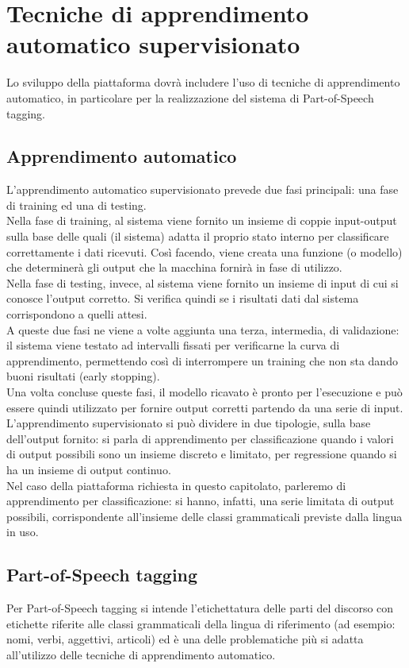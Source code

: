 \section{Tecniche di apprendimento automatico supervisionato}
Lo sviluppo della piattaforma dovrà includere l'uso di tecniche di apprendimento automatico, in particolare per la realizzazione del sistema di Part-of-Speech tagging. 
\subsection{Apprendimento automatico}
L'apprendimento automatico supervisionato prevede due fasi principali: una fase di training ed una di testing. \\
Nella fase di training, al sistema viene fornito un insieme di coppie input-output sulla base delle quali (il sistema) adatta il proprio stato interno per classificare correttamente i dati ricevuti. Così facendo, viene creata una funzione (o modello) che determinerà gli output che la macchina fornirà in fase di utilizzo. \\
Nella fase di testing, invece, al sistema viene fornito un insieme di input di cui si conosce l'output corretto. Si verifica quindi se i risultati dati dal sistema corrispondono a quelli attesi. \\
A queste due fasi ne viene a volte aggiunta una terza, intermedia, di validazione: il sistema viene testato ad intervalli fissati per verificarne la curva di apprendimento, permettendo così di interrompere un training che non sta dando buoni risultati (early stopping). \\
Una volta concluse queste fasi, il modello ricavato è pronto per l'esecuzione e può essere quindi utilizzato per fornire output corretti partendo da una serie di input. \\
L'apprendimento supervisionato si può dividere in due tipologie, sulla base dell'output fornito: si parla di apprendimento per classificazione quando i valori di output possibili sono un insieme discreto e limitato, per regressione quando si ha un insieme di output continuo. \\
Nel caso della piattaforma richiesta in questo capitolato, parleremo di apprendimento per classificazione: si hanno, infatti, una serie limitata di output possibili, corrispondente all'insieme delle classi grammaticali previste dalla lingua in uso. 

\subsection{Part-of-Speech tagging}
Per Part-of-Speech tagging si intende l'etichettatura delle parti del discorso con etichette riferite alle classi grammaticali della lingua di riferimento (ad esempio: nomi, verbi, aggettivi, articoli) ed è una delle problematiche più si adatta all'utilizzo delle tecniche di apprendimento automatico. \\

